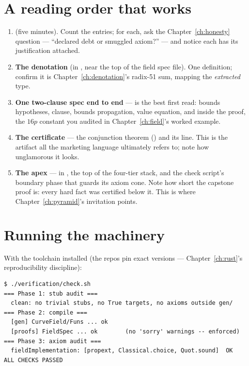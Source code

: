 \section{A reading order that works}

\begin{enumerate}[leftmargin=1.6em]
\item \textbf{} (five minutes). Count the
entries; for each, ask the Chapter~\ref{ch:honesty} question ---
``declared debt or smuggled axiom?'' --- and notice each has its
justification attached.
\item \textbf{The denotation} (in , near the top of the
field spec file). One definition; confirm it is
Chapter~\ref{ch:denotation}'s radix-51 sum, mapping the \emph{extracted}
type.
\item \textbf{One two-clause spec end to end} ---  is the
best first read: bounds hypotheses,  clause, bounds
propagation, value equation, and inside the proof, the $16p$ constant
you audited in Chapter~\ref{ch:field}'s worked example.
\item \textbf{The certificate} --- the conjunction theorem
() and its  line. This
is the artifact all the marketing language ultimately refers to; note
how unglamorous it looks.
\item \textbf{The apex} --- 
in , the top of the four-tier stack,
and the check script's boundary phase that guards its axiom cone. Note
how short the capstone proof is: every hard fact was certified below it.
This is where Chapter~\ref{ch:pyramid}'s invitation points.
\end{enumerate}

\section{Running the machinery}

With the toolchain installed (the repos pin exact versions ---
Chapter~\ref{ch:rust}'s reproducibility discipline):

\begin{lstlisting}
$ ./verification/check.sh
=== Phase 1: stub audit ===
  clean: no trivial stubs, no True targets, no axioms outside gen/
=== Phase 2: compile ===
  [gen] CurveField/Funs ... ok
  [proofs] FieldSpec ... ok        (no 'sorry' warnings -- enforced)
=== Phase 3: axiom audit ===
  fieldImplementation: [propext, Classical.choice, Quot.sound]  OK
ALL CHECKS PASSED
\end{lstlisting}

